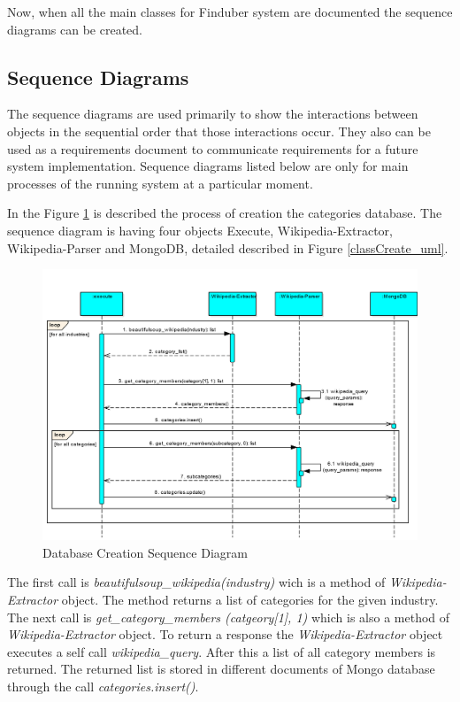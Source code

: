 Now, when all the main classes for Finduber system are documented the sequence diagrams can be created.

\subsection{Sequence Diagrams}

The sequence diagrams are used primarily to show the interactions between objects in the sequential order that those interactions occur. They also can be used as a requirements document to communicate requirements for a future system implementation. Sequence diagrams listed below are only for main processes of the running system at a particular moment. 

In the Figure \ref{createDB_uml} is described the process of creation the categories database. The sequence diagram is having four objects Execute, Wikipedia-Extractor, Wikipedia-Parser and MongoDB, detailed described in Figure \ref{classCreate_uml}.

\begin{figure}[!ht]
\centering
\includegraphics[width=15cm]{CreateDB-1}
\caption{Database Creation Sequence Diagram}\label{createDB_uml}
\end{figure}

The first call is \textit{beautifulsoup\_wikipedia(industry)} wich is a method of \textit{Wikipedia-Extractor} object. The method returns a list of categories for the given industry. The next call is \textit{get\_category\_members (catgeory[1], 1)} which is also a method of \textit{Wikipedia-Extractor} object. To return a response the \textit{Wikipedia-Extractor} object executes a self call \textit{wikipedia\_query}. After this a list of all category members is returned. The returned list is stored in different documents of Mongo database through the call \textit{categories.insert()}.

